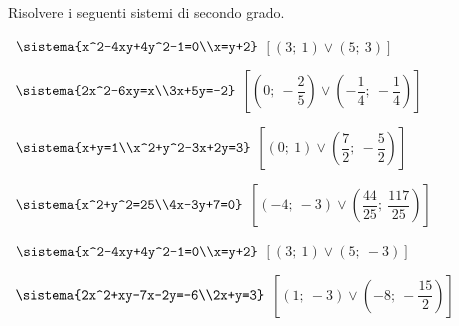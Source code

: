 \begin{esercizio}[*]
 \label{ese:6.1}
Risolvere i seguenti sistemi di secondo grado.
 \begin{enumeratea}
 \item~\(\sistema{x^2-4xy+4y^2-1=0\\x=y+2}\)
\hfill\(\left[\left(3;~1\right)\vee \left(5;~3\right)\right]\)
 \item~\(\sistema{2x^2-6xy=x\\3x+5y=-2}\)
\hfill\(\left[\left(0;~-\dfrac 2 5\right)\vee 
       \left(-\dfrac 1 4;~-\dfrac 1 4\right)\right]\)
 \item~\(\sistema{x+y=1\\x^2+y^2-3x+2y=3}\)
\hfill\(\left[\left(0;~1\right)\vee \left(\dfrac 7 2;~-\dfrac 5 
2\right)\right]\)
 \item~\(\sistema{x^2+y^2=25\\4x-3y+7=0}\)
\hfill\(\left[\left(-4;~-3\right) \vee 
       \left(\dfrac{44}{25};~\dfrac{117}{25}\right)\right]\)
 \item~\(\sistema{x^2-4xy+4y^2-1=0\\x=y+2}\)
\hfill\(\left[\left(3;~1\right)\vee \left(5;~-3\right)\right]\)
 \item~\(\sistema{2x^2+xy-7x-2y=-6\\2x+y=3}\)
\hfill\(\left[\left(1;~-3\right)\vee \left(-8;~-\dfrac{15} 2\right)\right]\)
 \end{enumeratea}
\end{esercizio}

